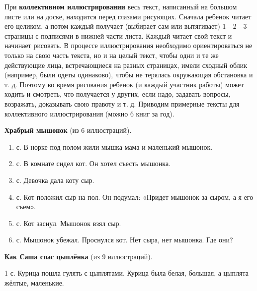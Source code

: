 \documentclass[a5paper]{book}
\begin{document}
При \textbf{коллективном иллюстрировании} весь текст, написанный на
большом листе или на доске, находится перед глазами рисующих. Сначала
ребенок читает его целиком, а потом каждый получает (выбирает сам или
вытягивает) 1---2---3 страницы с подписями в нижней части листа. Каждый
читает свой текст и начинает рисовать. В процессе иллюстрирования
необходимо ориентироваться не только на свою часть текста, но и на целый
текст, чтобы одни и те же действующие лица, встречающиеся на разных
страницах, имели сходный облик (например, были одеты одинаково), чтобы
не терялась окружающая обстановка и т. д. Поэтому во время рисования
ребенок (и каждый участник работы) может ходить и смотреть, что
получается у других, если надо, задавать вопросы, возражать, доказывать
свою правоту и т. д. Приводим примерные тексты для коллективного
иллюстрирования (можно 6 книг за год).

\textbf{Храбрый мышонок} (из 6 иллюстраций).


\begin{enumerate}
\def\labelenumi{\arabic{enumi}.}
\item
  
  с. В норке под полом жили мышка-мама и маленький мышонок.
  
\item
  
  с. В комнате сидел кот. Он хотел съесть мышонка.
  
\item
  
  с. Девочка дала коту сыр.
  
\item
  
  с. Кот положил сыр на пол. Он подумал: «Придет мышонок за сыром, а я
  его съем».
  
\item
  
  с. Кот заснул. Мышонок взял сыр.
  
\item
  
  с. Мышонок убежал. Проснулся кот. Нет сыра, нет мышонка. Где они?
  
\end{enumerate}


\textbf{Как Саша спас цыплёнка} (из 9 иллюстраций).

1 с. Курица пошла гулять с цыплятами. Курица была белая, большая, а
цыплята жёлтые, маленькие.
\end{document}
